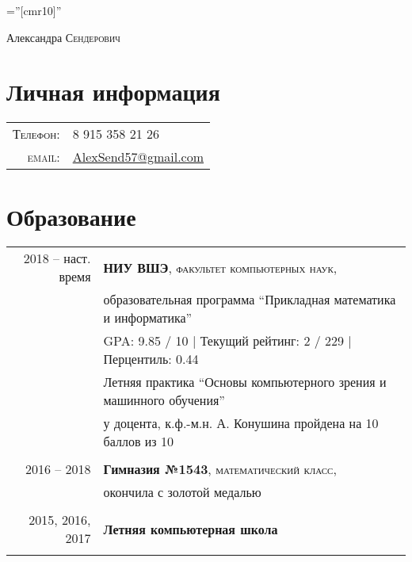 \documentclass[a4paper,10pt]{article}
\begin{document}

\pagestyle{empty} %

\font\fb=''[cmr10]'' %

\par{\centering
		{\Huge Александра \textsc{Сендерович}
	}\bigskip\par}

\section{Личная информация}

\begin{tabular}{rl}
    \textsc{Телефон:}     & 8 915 358 21 26\\
    \textsc{email:}     & \href{mailto:AlexSend57@gmail.com}{AlexSend57@gmail.com}
\end{tabular}

\section{Образование}
\begin{tabular}{rl}	
2018 -- наст. время & \textbf{НИУ ВШЭ}, \textsc{факультет компьютерных наук}, \\ & образовательная программа ``Прикладная математика и информатика''\\
& GPA: 9.85 / 10 | Текущий рейтинг: 2 / 229 | Перцентиль: 0.44 \\
& Летняя практика ``Основы компьютерного зрения и машинного обучения'' \\
& у доцента, к.ф.-м.н. А. Конушина пройдена на 10 баллов из 10 \\
&\\

2016 -- 2018 & \textbf{Гимназия №1543}, \textsc{математический класс}, \\
& окончила с золотой медалью \\
&\\

2015, 2016, 2017 & \textbf{Летняя компьютерная школа}\\
&\\
\end{tabular}
\end{document}
